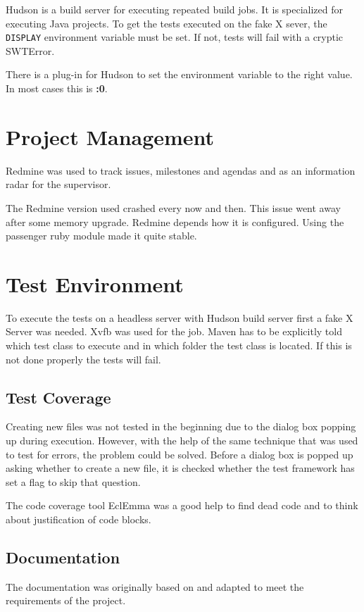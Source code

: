 Hudson is a build server for executing repeated build jobs. It is specialized
for executing Java projects. To get the tests executed on the fake X sever, the
\texttt{DISPLAY} environment variable must be set. If not, tests will fail with
a cryptic SWTError.

There is a plug-in for Hudson\cite{hudson} to set the environment variable to
the right value. In most cases this is \textbf{:0}.

\section{Project Management}

Redmine\cite{redmine} was used to track issues, milestones and agendas and as an information 
radar for the supervisor.

The Redmine version used crashed every now and then. This issue went away after
some memory upgrade. Redmine depends how it is configured. Using the passenger
ruby module made it quite stable. 

\section{Test Environment}

To execute the tests on a headless server with Hudson build server first a fake
X Server was needed. Xvfb\cite{xvfb} was used for the job. Maven has to be
explicitly told which test class to execute and in which folder the test class
is located. If this is not done properly the tests will fail.

\subsection{Test Coverage}

Creating new files was not tested in the beginning due to the dialog box popping 
up during execution. However, with the help of the same technique that was used 
to test for errors, the problem could be solved. Before a dialog box is popped 
up asking whether to create a new file, it is checked whether the test framework 
has set a flag to skip that question.

The code coverage tool EclEmma\cite{eclEmma} was a good help to find dead code 
and to think about justification of code blocks.

\subsection{Documentation}

The documentation was originally based on \cite{AV08} and adapted to meet the 
requirements of the project.

